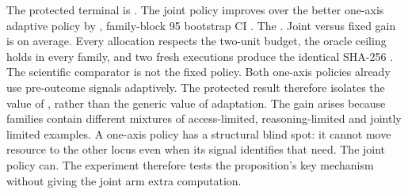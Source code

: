 \markdownRendererDocumentBegin
\markdownRendererSectionBegin
{}\markdownRendererInterblockSeparator
{}The protected terminal is .\markdownRendererInterblockSeparator
{}\markdownRendererInterblockSeparator
{}The joint policy improves over the better one-axis adaptive policy by , family-block 95\markdownRendererPercentSign{} bootstrap CI \markdownRendererStrongEmphasis{\markdownRendererCodeSpan{[0.286008, 0.382693]}}.\markdownRendererInterblockSeparator
{}The . Joint versus fixed  gain is  on average. Every allocation respects the two-unit budget, the oracle ceiling holds in every family, and two fresh executions produce the identical SHA-256\markdownRendererInterblockSeparator
{}.\markdownRendererInterblockSeparator
{}\markdownRendererSectionBegin
{}\markdownRendererInterblockSeparator
{}The scientific comparator is not the fixed  policy. Both one-axis policies already use pre-outcome signals adaptively. The protected result therefore isolates the value of , rather than the generic value of adaptation.\markdownRendererInterblockSeparator
{}
\markdownRendererSectionEnd \markdownRendererSectionBegin
{}\markdownRendererInterblockSeparator
{}The gain arises because families contain different mixtures of access-limited, reasoning-limited and jointly limited examples. A one-axis policy has a structural blind spot: it cannot move resource to the other locus even when its signal identifies that need. The joint policy can.\markdownRendererInterblockSeparator
{}The experiment therefore tests the proposition's key mechanism without giving the joint arm extra computation.
\markdownRendererSectionEnd 
\markdownRendererSectionEnd \markdownRendererDocumentEnd